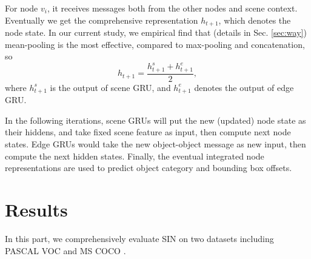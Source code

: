 \documentclass[10pt,twocolumn,letterpaper]{article}
\begin{document}
For node $v_{i}$, it receives messages both from the other nodes and scene context. Eventually we get the comprehensive representation $h_{t+1}$, which denotes the node state. In our current study, we empirical find that (details in Sec. \ref{sec:way}) mean-pooling is the most effective, compared to max-pooling and concatenation, so
\begin{equation}
h_{t+1} =\frac{h^s_{t+1}+ h^e_{t+1}}{2},
\end{equation}
where $h^s_{t+1}$ is the output of scene GRU, and $h^e_{t+1}$ denotes the output of edge GRU.

In the following iterations, scene GRUs will put the new (updated) node state as their hiddens, and take fixed scene feature as input, then compute next node states. Edge GRUs would take the new object-object message as new input, then compute the next hidden states. Finally, the eventual integrated node representations are used to predict object category and bounding box offsets.


\section{Results}

In this part, we comprehensively evaluate SIN on two datasets including PASCAL VOC \cite{voc} and MS COCO \cite{coco}. 

\end{document}
